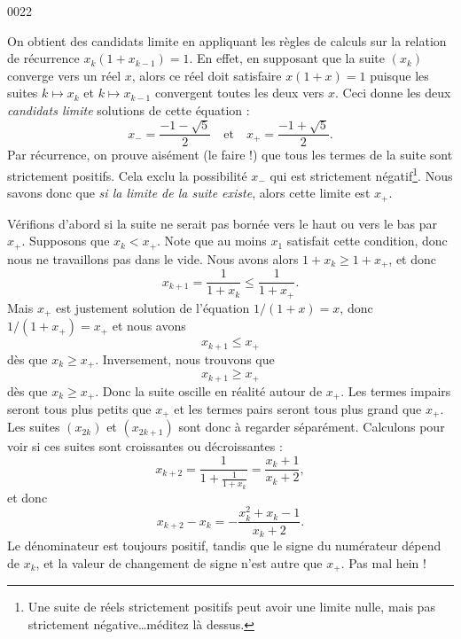
\begin{corrige}{0022}

On obtient des candidats limite en appliquant les règles de calculs sur la relation de récurrence $x_k (1+x_{k-1}) = 1$. En effet, en supposant que la suite $(x_k)$ converge vers un réel $x$, alors ce réel doit satisfaire $x(1+x) = 1$ puisque les suites $k\mapsto x_k$ et $k\mapsto x_{k-1}$ convergent toutes les deux vers $x$. Ceci donne les deux \emph{candidats limite} solutions de cette équation :
\begin{equation}
  x_- = \frac{-1 - \sqrt5}{2} \quad\text{et}\quad x_+ = \frac{-1 + \sqrt5}2.
\end{equation}
Par récurrence, on prouve aisément (le faire !) que tous les termes de la suite sont strictement positifs. Cela exclu la possibilité $x_-$ qui est strictement négatif\footnote{Une suite de réels strictement positifs peut avoir une limite nulle, mais pas strictement négative\ldots méditez là dessus.}. Nous savons donc que \emph{si la limite de la suite existe}, alors cette limite est $x_+$.

Vérifions d'abord si la suite ne serait pas bornée vers le haut ou vers le bas par $x_+$. Supposons que $x_k<x_+$. Note que au moins $x_1$ satisfait cette condition, donc nous ne travaillons pas dans le vide. Nous avons alors $1+x_k\geq 1+x_+$, et donc
\begin{equation}
	x_{k+1}=\frac{1}{ 1+x_k }\leq\frac{1}{ 1+x_+ }.
\end{equation}
Mais $x_+$ est justement solution de l'équation $1/(1+x)=x$, donc $1/(1+x_+)=x_+$ et nous avons
\begin{equation}
	x_{k+1}\leq x_+
\end{equation}
dès que $x_k\geq x_+$. Inversement, nous trouvons que
\begin{equation}
	x_{k+1}\geq x_+
\end{equation}
dès que $x_k\geq x_+$. Donc la suite oscille en réalité autour de $x_+$. Les termes impairs seront tous plus petits que $x_+$ et les termes pairs seront tous plus grand que $x_+$. Les suites $(x_{2k})$ et $(x_{2k+1})$ sont donc à regarder séparément. Calculons pour voir si ces suites sont croissantes ou décroissantes :
\begin{equation}		\label{EqNombreOrxkPlusDeux}
	x_{k+2}=\frac{1}{  1+\frac{1}{ 1+x_k }  }=\frac{ x_k+1 }{ x_k+2 },
\end{equation}
et donc
\begin{equation}
	x_{k+2}-x_k=-\frac{ x_k^2+x_{k}-1 }{ x_k+2 }.
\end{equation}
Le dénominateur est toujours positif, tandis que le signe du numérateur dépend de $x_k$, et la valeur de changement de signe n'est autre que $x_+$. Pas mal hein !


\end{corrige}
